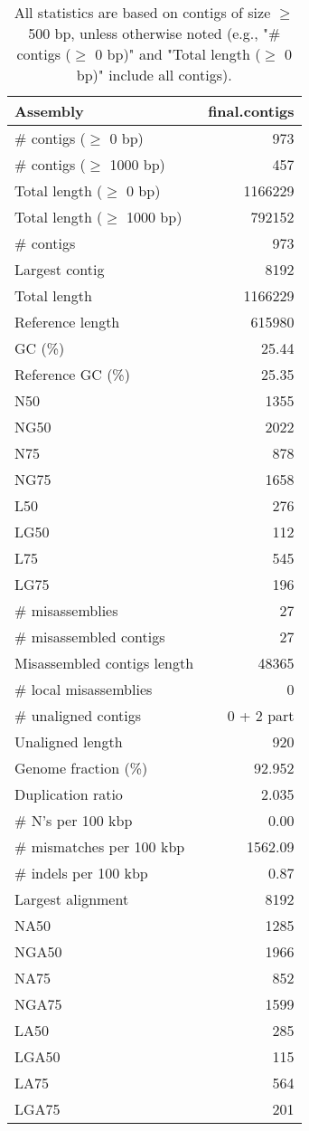 \documentclass[12pt,a4paper]{article}
\begin{document}
\begin{table}[ht]
\begin{center}
\caption{All statistics are based on contigs of size $\geq$ 500 bp, unless otherwise noted (e.g., "\# contigs ($\geq$ 0 bp)" and "Total length ($\geq$ 0 bp)" include all contigs).}
\begin{tabular}{|l*{1}{|r}|}
\hline
Assembly & final.contigs \\ \hline
\# contigs ($\geq$ 0 bp) & 973 \\ \hline
\# contigs ($\geq$ 1000 bp) & 457 \\ \hline
Total length ($\geq$ 0 bp) & 1166229 \\ \hline
Total length ($\geq$ 1000 bp) & 792152 \\ \hline
\# contigs & 973 \\ \hline
Largest contig & 8192 \\ \hline
Total length & 1166229 \\ \hline
Reference length & 615980 \\ \hline
GC (\%) & 25.44 \\ \hline
Reference GC (\%) & 25.35 \\ \hline
N50 & 1355 \\ \hline
NG50 & 2022 \\ \hline
N75 & 878 \\ \hline
NG75 & 1658 \\ \hline
L50 & 276 \\ \hline
LG50 & 112 \\ \hline
L75 & 545 \\ \hline
LG75 & 196 \\ \hline
\# misassemblies & 27 \\ \hline
\# misassembled contigs & 27 \\ \hline
Misassembled contigs length & 48365 \\ \hline
\# local misassemblies & 0 \\ \hline
\# unaligned contigs & 0 + 2 part \\ \hline
Unaligned length & 920 \\ \hline
Genome fraction (\%) & 92.952 \\ \hline
Duplication ratio & 2.035 \\ \hline
\# N's per 100 kbp & 0.00 \\ \hline
\# mismatches per 100 kbp & 1562.09 \\ \hline
\# indels per 100 kbp & 0.87 \\ \hline
Largest alignment & 8192 \\ \hline
NA50 & 1285 \\ \hline
NGA50 & 1966 \\ \hline
NA75 & 852 \\ \hline
NGA75 & 1599 \\ \hline
LA50 & 285 \\ \hline
LGA50 & 115 \\ \hline
LA75 & 564 \\ \hline
LGA75 & 201 \\ \hline
\end{tabular}
\end{center}
\end{table}
\end{document}
